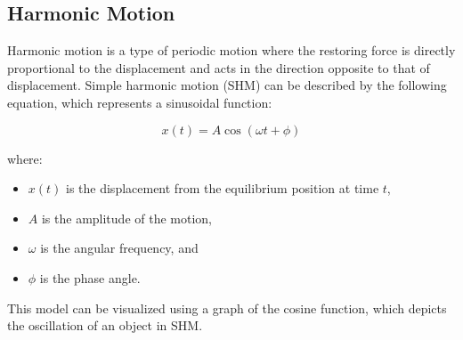 \documentclass[a4paper,12pt]{book}
\newcounter{example}
\begin{document}

\subsection{Harmonic Motion}
\label{subsec:harmonic_motion}

Harmonic motion is a type of periodic motion where the restoring force is directly proportional to the displacement and acts in the direction opposite to that of displacement. Simple harmonic motion (SHM) can be described by the following equation, which represents a sinusoidal function:

\[ x(t) = A \cos(\omega t + \phi) \]

where:
\begin{itemize}
    \item \( x(t) \) is the displacement from the equilibrium position at time \( t \),
    \item \( A \) is the amplitude of the motion,
    \item \( \omega \) is the angular frequency, and
    \item \( \phi \) is the phase angle.
\end{itemize}

This model can be visualized using a graph of the cosine function, which depicts the oscillation of an object in SHM.

\begin{center}
\end{center}
\end{document}

